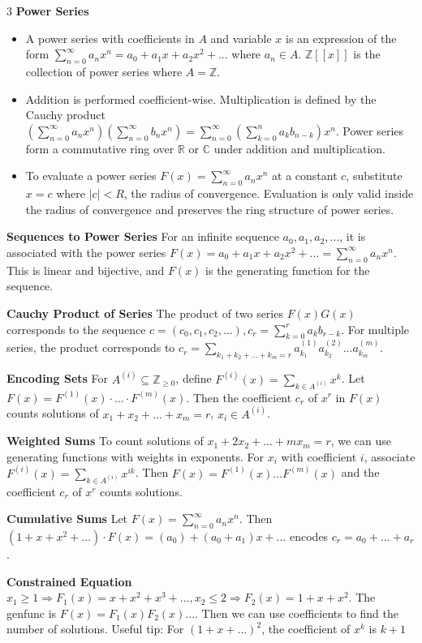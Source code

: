 \documentclass[10pt, landscape]{article}
\begin{document}
\begin{multicols*}{3}
\textbf{Power Series}
\begin{itemize}
    \item A power series with coefficients in $A$ and variable $x$ is an expression of the form $\sum_{n=0}^\infty a_nx^n=a_0+a_1x+a_2x^2+...$ where $a_n \in A$. $\mathbb{Z}[[x]]$ is the collection of power series where $A=\mathbb{Z}$.
    \item Addition is performed coefficient-wise. Multiplication is defined by the Cauchy product $(\sum_{n=0}^\infty a_nx^n)(\sum_{n=0}^\infty b_nx^n)=\sum_{n=0}^\infty(\sum_{k=0}^na_kb_{n-k})x^n$. Power series form a commutative ring over $\mathbb{R}$ or $\mathbb{C}$ under addition and multiplication.
    \item To evaluate a power series $F(x)=\sum_{n=0}^\infty a_nx^n$ at a constant $c$, substitute $x=c$ where $|c|<R$, the radius of convergence. Evaluation is only valid inside the radius of convergence and preserves the ring structure of power series.
\end{itemize}

\textbf{Sequences to Power Series} For an infinite sequence $a_0,a_1,a_2,...$, it is associated with the power series $F(x)=a_0+a_1x+a_2x^2+...=\sum_{n=0}^\infty a_nx^n$. This is linear and bijective, and $F(x)$ is the generating function for the sequence.

\textbf{Cauchy Product of Series} The product of two series $F(x)G(x)$ corresponds to the sequence $c=(c_0, c_1, c_2,...), c_r=\sum_{k=0}^ra_kb_{r-k}$. For multiple series, the product corresponds to $c_r=\sum_{k_1+k_2+...+k_m=r}a_{k_1}^{(1)}a_{k_2}^{(2)}...a_{k_m}^{(m)}$.

\textbf{Encoding Sets} For $A^{(i)}\subseteq \mathbb{Z}_{\geq 0}$, define $F^{(i)}(x)=\sum_{k \in A^{(i)}}x^k$. Let $F(x)=F^{(1)}(x)\cdot...\cdot F^{(m)}(x)$. Then the coefficient $c_r$ of $x^r$ in $F(x)$ counts solutions of $x_1+x_2+...+x_m=r$, $x_i \in A^{(i)}$.

\textbf{Weighted Sums} To count solutions of $x_1+2x_2+...+mx_m=r$, we can use generating functions with weights in exponents. For $x_i$ with coefficient $i$, associate $F^{(i)}(x)=\sum_{k\in A^{(i)}}x^{ik}$. Then $F(x)=F^{(1)}(x)...F^{(m)}(x)$ and the coefficient $c_r$ of $x^r$ counts solutions.

\textbf{Cumulative Sums} Let $F(x)=\sum_{n=0}^\infty a_n x^n$. Then $(1+x+x^2+...)\cdot F(x)=(a_0)+(a_0+a_1)x+...$ encodes $c_r=a_0+...+a_r$.

\textbf{Constrained Equation} $x_1 \geq 1 \Rightarrow F_1(x)=x+x^2+x^3+..., x_2 \leq 2 \Rightarrow F_2(x)=1+x+x^2$. The genfunc is $F(x)=F_1(x)F_2(x)...$. Then we can use coefficients to find the number of solutions. Useful tip: For $(1+x+...)^2$, the coefficient of $x^k$ is $k+1$


\end{multicols*}
\end{document}
